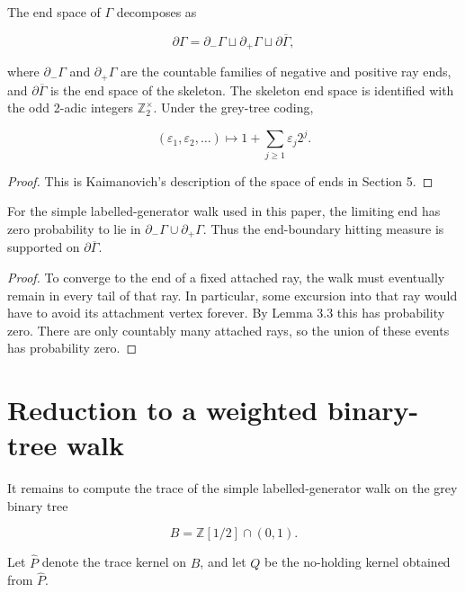 \documentclass[11pt,a4paper]{scrartcl}
\begin{document}
\begin{proposition}\label{prop:end-space-coding}
The end space of
\(\Gamma\) decomposes as

\[
\partial\Gamma
=
\partial_-\Gamma
\sqcup
\partial_+\Gamma
\sqcup
\partial\overline\Gamma,
\]

where \(\partial_-\Gamma\) and \(\partial_+\Gamma\) are the countable families
of negative and positive ray ends, and \(\partial\overline\Gamma\) is the end
space of the skeleton. The skeleton end space is identified with the
odd 2-adic integers \(\mathbb Z_2^\times\). Under the grey-tree coding,

\[
(\varepsilon_1,\varepsilon_2,\ldots)
\longmapsto
1+\sum_{j\ge 1}\varepsilon_j2^j .
\]

\end{proposition}

\begin{proof}
This is Kaimanovich's description of the space of ends in Section 5.
\end{proof}

\begin{lemma}\label{lem:centered-support-skeleton}
For the simple labelled-generator walk used in this paper, the limiting end has zero
probability to lie in \(\partial_-\Gamma\cup\partial_+\Gamma\). Thus the
end-boundary hitting measure is supported on \(\partial\overline\Gamma\).

\end{lemma}
\begin{proof}
To converge to the end of a fixed attached ray, the walk must
eventually remain in every tail of that ray. In particular, some excursion into
that ray would have to avoid its attachment vertex forever. By Lemma 3.3 this
has probability zero. There are only countably many attached rays, so the union
of these events has probability zero.
\end{proof}


\section{Reduction to a weighted binary-tree walk}\label{sec:reduction-to-a-weighted-binary-tree-walk}


It remains to compute the trace of the simple labelled-generator walk on the
grey binary tree

\[
B=\mathbb Z[1/2]\cap(0,1).
\]

Let \(\widehat P\) denote the trace kernel on \(B\), and let \(Q\) be the
no-holding kernel obtained from \(\widehat P\).
\end{document}
